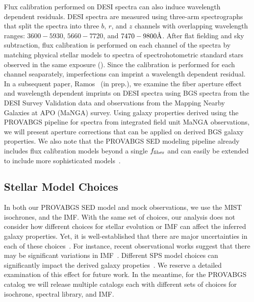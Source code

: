 Flux calibration performed on DESI spectra can also induce wavelength dependent
residuals. 
DESI spectra are measured using three-arm spectrographs that split the spectra
into three $b$, $r$, and $z$ channels with overlapping wavelength ranges: 
$3600 - 5930$, $5660 - 7720$, and $7470 - 9800 \AA$.  
After flat fielding and sky subtraction, flux calibration is performed on each
channel of the spectra by matching physical stellar models to spectra of
spectrohotometric standard stars observed in the same exposure
(). 
Since the calibration is performed for each channel seaparately, imperfections
can imprint a wavelength dependent residual. 
In a subsequent paper, Ramos \etal~(in prep.), we examine the fiber aperture
effect and wavelength dependent imprints on DESI spectra using BGS
spectra from the DESI Survey Validation data and observations from the Mapping
Nearby Galaxies at APO (MaNGA) survey. 
Using galaxy properties derived using the {\sc PROVABGS} pipeline for spectra
from integrated field unit MaNGA observations, we will present aperture
corrections that can be applied on derived BGS galaxy properties. 
We also note that the {\sc PROVABGS} SED modeling pipeline already includes flux
calibration models beyond a single $f_{\rm fiber}$ and can easily be extended
to include more sophisticated models~\citep[\emph{e.g.} Chebyschev
polynomial;][]{carnall2017, tacchella2021}. 

\subsection{Stellar Model Choices}
In both our {\sc PROVABGS} SED model and mock observations, we use the MIST
isochrones, 
and the \cite{chabrier2003} IMF.
With the same set of choices, our analysis does not consider how different
choices for stellar evolution or IMF can affect the inferred galaxy properties. 
Yet, it is well-established that there are major uncertainties in each of these
choices~\citep{conroy2009, conroy2013}.
For instance, recent observational works suggest that there may be significant
variations in IMF~\citep[\emph{e.g.}][]{treu2010, vandokkum2010, rosani2018,
sonnenfeld2019}. 
Different SPS model choices can significantly impact the derived galaxy
propeties~\citep[\emph{e.g.}][]{ge2019}.
We reserve a detailed examination of this effect for future work. 
In the meantime, for the {\sc PROVABGS} catalog we will release multiple
catalogs each with different sets of choices for isochrone, spectral library,
and IMF.

